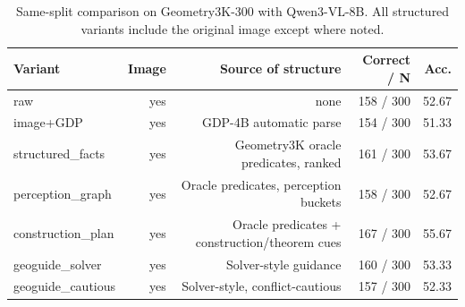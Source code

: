 \begin{table}[t]
\centering
\caption{Same-split comparison on Geometry3K-300 with Qwen3-VL-8B. All structured variants include the original image except where noted.}
\label{tab:main-geometry300}
\small
\begin{tabular}{lrrrr}
\toprule
Variant & Image & Source of structure & Correct / N & Acc. \\
\midrule
raw & yes & none & 158 / 300 & 52.67 \\
image+GDP & yes & GDP-4B automatic parse & 154 / 300 & 51.33 \\
structured\_facts & yes & Geometry3K oracle predicates, ranked & 161 / 300 & 53.67 \\
perception\_graph & yes & Oracle predicates, perception buckets & 158 / 300 & 52.67 \\
construction\_plan & yes & Oracle predicates + construction/theorem cues & 167 / 300 & 55.67 \\
geoguide\_solver & yes & Solver-style guidance & 160 / 300 & 53.33 \\
geoguide\_cautious & yes & Solver-style, conflict-cautious & 157 / 300 & 52.33 \\
\bottomrule
\end{tabular}
\end{table}
